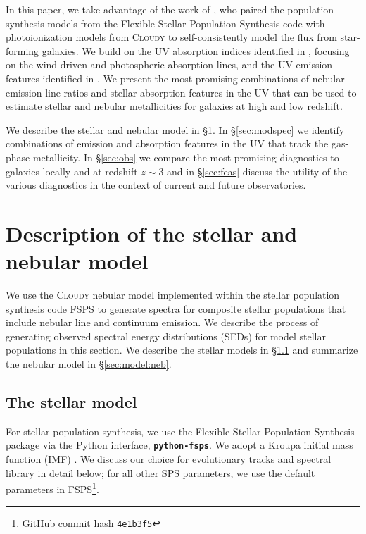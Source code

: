 \documentclass[preprint2]{aastex61}
\newcommand{\z}[1]{$z \sim {#1}$}
\newcommand{\FSPS}{{\sc FSPS}\xspace}
\newcommand{\pFSPS}{{\tt \textbf{python-fsps}}\xspace}
\newcommand{\Cloudy}{\textsc{Cloudy}\xspace}
\begin{document}
In this paper, we take advantage of the work of \citet{Byler+2016}, who paired the population synthesis models from the Flexible Stellar Population Synthesis code \citep[\FSPS; ][]{Conroy+2009, Conroy+2010} with photoionization models from \Cloudy to self-consistently model the flux from star-forming galaxies. We build on the UV absorption indices identified in \citet{Leitherer+2011}, focusing on the wind-driven and photospheric absorption lines, and the UV emission features identified in \citet{Erb+2010}. We present the most promising combinations of nebular emission line ratios and stellar absorption features in the UV that can be used to estimate stellar and nebular metallicities for galaxies at high and low redshift.

We describe the stellar and nebular model in \S\ref{sec:model}. In \S\ref{sec:modspec} we identify combinations of emission and absorption features in the UV that track the gas-phase metallicity. In \S\ref{sec:obs} we compare the most promising diagnostics to galaxies locally and at redshift \z{3} and in \S\ref{sec:feas} discuss the utility of the various diagnostics in the context of current and future observatories.

\section{Description of the stellar and nebular model} \label{sec:model}

We use the \Cloudy nebular model implemented within the stellar population synthesis code \FSPS to generate spectra for composite stellar populations that include nebular line and continuum emission. We describe the process of generating observed spectral energy distributions (SEDs) for model stellar populations in this section. We describe the stellar models in \S\ref{sec:model:stellar} and summarize the nebular model in \S\ref{sec:model:neb}.

\subsection{The stellar model}\label{sec:model:stellar}

For stellar population synthesis, we use the Flexible Stellar Population Synthesis package \citep[\FSPS;][]{Conroy+2009, Conroy+2010} via the Python interface, \pFSPS \citep{pythonFSPSdfm}. We adopt a Kroupa initial mass function (IMF) \citep{Kroupa+2001}. We discuss our choice for evolutionary tracks and spectral library in detail below; for all other SPS parameters, we use the default parameters in \FSPS\footnote{GitHub commit hash \texttt{4e1b3f5}}.
\end{document}

